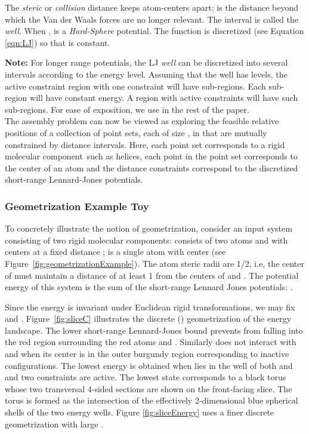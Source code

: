 \documentclass[]{article}
\newcommand{\figref}[1]{Figure~\ref{#1}}
\newcommand{\rmc}{rigid molecular component}
\newcommand{\toythreed}{Toy}
\begin{document}
The {\em steric} or {\em collision} distance  keeps atom-centers
apart;  is the distance beyond which the Van der Waals forces are
no longer relevant. The interval  is called the
\emph{well}. When ,  is a \emph{Hard-Sphere}
potential. The function  is discretized (see Equation \ref{eqn:LJ}) so that
 is constant. 

{\bf Note:} For longer range potentials, the LJ \emph{well} can be discretized
into several intervals according to the energy level. Assuming that the well
has  levels, the active constraint region with one constraint will have 
sub-regions. Each sub-region will have constant energy. A region with 
active constraints will have  such sub-regions. For ease of
exposition, we use  in the rest of the paper.\\

The assembly problem can now be viewed as exploring the feasible relative
positions of a collection of  point sets, each of size , in 
that are mutually constrained by distance intervals. Here, each point set
corresponds to a \rmc\ such as helices, each point in the
point set corresponds to the center of an atom and the distance
constraints correspond to the discretized short-range Lennard-Jones potentials.

\subsubsection{Geometrization Example \toythreed}
\label{sec:geometrizationExample}
To concretely illustrate the notion of geometrization, consider an input system
consisting of two rigid molecular components:  consists of two atoms  and 
with centers at a fixed distance ;  is a
single atom  with center  (see \figref{fig:geometrizationExample}). 
The atom steric radii are 1/2, i.e, the
center of  must maintain a distance of at least 1 from the centers of
 and . The potential energy  of this system is the sum of the
short-range Lennard Jones potentials: . 

Since the energy is invariant under Euclidean rigid transformations,
we may fix  and . \figref{fig:sliceC}
illustrates the discrete () geometrization of the energy
landscape. The lower short-range Lennard-Jones bound prevents  from falling into the red region
surrounding the red atoms  and . Similarly  does not interact
with  and  when its center is in the outer burgundy region
corresponding to inactive configurations. The lowest energy is obtained when
 lies in the well of both  and  and two constraints are active.
The lowest state corresponds to a
black torus whose two transversal 4-sided sections are shown on the
front-facing slice. The torus is formed as the intersection of the effectively
2-dimensional blue spherical shells of the two energy wells. 
Figure \ref{fig:sliceEnergy} uses a finer discrete geometrization with large .
\end{document}
